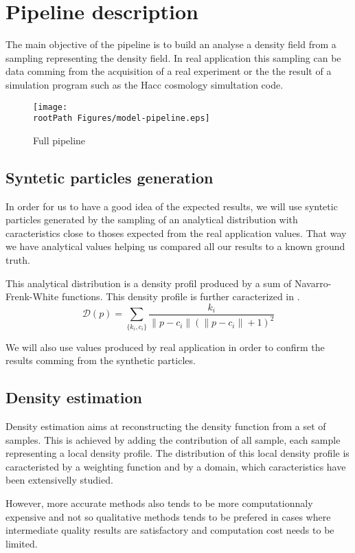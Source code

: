 \documentclass[10pt,a4paper,twoside,twocolumn]{article}
\newcommand*{\rootPath}{../}
\begin{document}
\section{Pipeline description}
The main objective of the pipeline is to build an analyse a density field from a
sampling representing the  density field. In real application this sampling can
be data comming from the acquisition of a real experiment or the the result of a
simulation program such as the Hacc cosmology simultation code.

\begin{figure}[!ht]
	\centering
	\texttt{[image: \\rootPath Figures/model-pipeline.eps]}
	\caption{Full pipeline}
	\label{fig:pipeline}
\end{figure}

\subsection{Syntetic particles generation}

In order for us to have a good idea of the expected results, we will use
syntetic particles generated by the sampling of an analytical distribution with
caracteristics close to thoses expected from the real application values. That
way we have analytical values helping us compared all our results to a known
ground truth.

This analytical distribution is a density profil produced by a sum of
Navarro-Frenk-White functions\cite{navarro96}. This density profile is further
caracterized in .
$$\mathcal D(p) = \sum_{\{k_i, c_i\}} \frac{k_i}{\|p-c_i\|(\|p-c_i\|+1)^2}$$

We will also use values produced by real application in order to confirm the
results comming from the synthetic particles.

\subsection{Density estimation}

Density estimation aims at reconstructing the density function from a set of
samples. This is achieved by adding the contribution of all sample, each sample
representing a local density profile. The distribution of this local density
profile is caracteristed by a weighting function and by a domain, which
caracteristics have been extensivelly studied.

However, more accurate methods also tends to be more computationnaly expensive
and not so qualitative methods tends to be prefered in cases where intermediate
quality results are satisfactory and computation cost needs to be limited.
\end{document}
